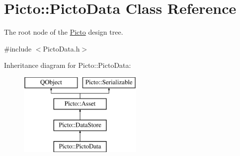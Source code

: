 \hypertarget{class_picto_1_1_picto_data}{\section{Picto\-:\-:Picto\-Data Class Reference}
\label{class_picto_1_1_picto_data}
}


The root node of the \hyperlink{namespace_picto}{Picto} design tree.  




{\ttfamily \#include $<$Picto\-Data.\-h$>$}

Inheritance diagram for Picto\-:\-:Picto\-Data\-:\begin{figure}[H]
\begin{center}
\leavevmode
\includegraphics[height=4.000000cm]{class_picto_1_1_picto_data}
\end{center}
\end{figure}
